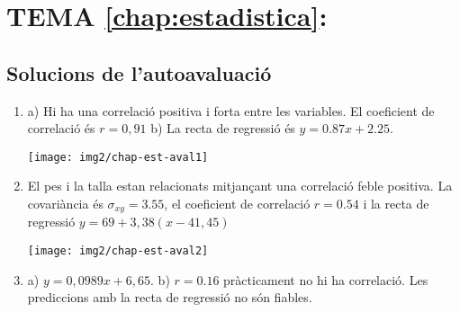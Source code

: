 \section*{TEMA \ref{chap:estadistica}: }

\subsection*{Solucions de l'autoavaluació}

\begin{enumerate}
	\item \begin{minipage}{0.7\textwidth} a) Hi ha una correlació positiva i forta entre les variables. El coeficient de correlació és $r=0,91$  b) La recta de regressió és $y=0.87x+2.25$. \end{minipage}
	\begin{minipage}{0.3\textwidth}
		\texttt{[image: img2/chap-est-aval1]}
		\end{minipage}
	 
	
		\item \begin{minipage}{0.7\textwidth} El pes i la talla estan relacionats mitjançant una correlació feble positiva. La covariància és $\sigma_{xy}=3.55$, el coeficient de correlació $r=0.54$ i la recta de regressió $y=69+3,38(x-41,45)$ \end{minipage}
	\begin{minipage}{0.3\textwidth}
		\texttt{[image: img2/chap-est-aval2]}
	\end{minipage}

		\item a) $y=0,0989 x + 6,65$. b) $r=0.16$ pràcticament no hi ha correlació. Les prediccions amb la recta de regressió no són fiables.
\end{enumerate}